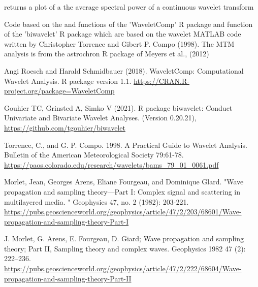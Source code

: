 \documentclass[a4paper]{book}
\begin{document}
%
\begin{Value}
returns a plot of a the average spectral power of a continuous wavelet transform
\end{Value}
%
\begin{Author}
Code based on the  and  functions of the 'WaveletComp' R package
and  function of the 'biwavelet' R package which are based on the
wavelet MATLAB code written by Christopher Torrence and Gibert P. Compo (1998).
The MTM analysis is from the astrochron R package of Meyers et al., (2012)
\end{Author}
%
\begin{References}
Angi Roesch and Harald Schmidbauer (2018). WaveletComp: Computational
Wavelet Analysis. R package version 1.1.
\url{https://CRAN.R-project.org/package=WaveletComp}

Gouhier TC, Grinsted A, Simko V (2021). R package biwavelet: Conduct Univariate and Bivariate Wavelet Analyses. (Version 0.20.21),
\url{https://github.com/tgouhier/biwavelet}

Torrence, C., and G. P. Compo. 1998. A Practical Guide to Wavelet Analysis.
Bulletin of the American Meteorological Society 79:61-78.
\url{https://paos.colorado.edu/research/wavelets/bams_79_01_0061.pdf}

Morlet, Jean, Georges Arens, Eliane Fourgeau, and Dominique Glard.
"Wave propagation and sampling theory—Part I: Complex signal and scattering in multilayered media.
" Geophysics 47, no. 2 (1982): 203-221.
\url{https://pubs.geoscienceworld.org/geophysics/article/47/2/203/68601/Wave-propagation-and-sampling-theory-Part-I}

J. Morlet, G. Arens, E. Fourgeau, D. Giard;
Wave propagation and sampling theory; Part II, Sampling theory and complex waves.
Geophysics 1982 47 (2): 222–236. \url{https://pubs.geoscienceworld.org/geophysics/article/47/2/222/68604/Wave-propagation-and-sampling-theory-Part-II}
\end{References}
%
\end{document}
